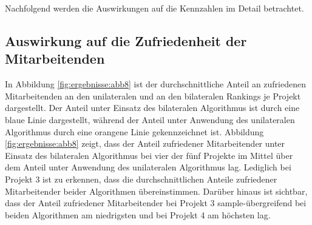 Nachfolgend werden die Auswirkungen auf die Kennzahlen im Detail betrachtet.

\subsection{Auswirkung auf die Zufriedenheit der Mitarbeitenden}
In Abbildung \ref{fig:ergebnisse:abb8} ist der durchschnittliche Anteil an zufriedenen Mitarbeitenden an den unilateralen und an den bilateralen Rankings je Projekt dargestellt.
Der Anteil unter Einsatz des bilateralen Algorithmus ist durch eine blaue Linie dargestellt, während der Anteil unter Anwendung des unilateralen Algorithmus durch eine orangene Linie gekennzeichnet ist.
Abbildung \ref{fig:ergebnisse:abb8} zeigt, dass der Anteil zufriedener Mitarbeitender unter Einsatz des bilateralen Algorithmus bei vier der fünf Projekte im Mittel über dem Anteil unter Anwendung des unilateralen Algorithmus lag.
Lediglich bei Projekt 3 ist zu erkennen, dass die durchschnittlichen Anteile zufriedener Mitarbeitender beider Algorithmen übereinstimmen.
Darüber hinaus ist sichtbar, dass der Anteil zufriedener Mitarbeitender bei Projekt 3 sample-übergreifend bei beiden Algorithmen am niedrigsten und bei Projekt 4 am höchsten lag.

